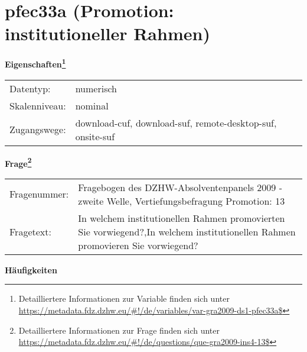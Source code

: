 
    \setcounter{footnote}{0}

    \vspace*{-1.8cm}
	\section{pfec33a (Promotion: institutioneller Rahmen)}
	\label{section:pfec33a}



    \vspace*{0.5cm}
    \noindent\textbf{Eigenschaften\footnote{Detailliertere Informationen zur Variable finden sich unter
		\url{https://metadata.fdz.dzhw.eu/\#!/de/variables/var-gra2009-ds1-pfec33a$}}}\\
	\begin{tabularx}{\hsize}{@{}lX}
	Datentyp: & numerisch \\
	Skalenniveau: & nominal \\
	Zugangswege: &
	  download-cuf, 
	  download-suf, 
	  remote-desktop-suf, 
	  onsite-suf
 \\
    \end{tabularx}



				\vspace*{0.5cm}
                \noindent\textbf{Frage\footnote{Detailliertere Informationen zur Frage finden sich unter
		              \url{https://metadata.fdz.dzhw.eu/\#!/de/questions/que-gra2009-ins4-13$}}}\\
				\begin{tabularx}{\hsize}{@{}lX}
					Fragenummer: &
					  Fragebogen des DZHW-Absolventenpanels 2009 - zweite Welle, Vertiefungsbefragung Promotion:
					  13
 \\
					Fragetext: & In welchem institutionellen Rahmen promovierten Sie vorwiegend?,In welchem institutionellen Rahmen promovieren Sie vorwiegend? \\
				\end{tabularx}





        		\vspace*{0.5cm}
                \noindent\textbf{Häufigkeiten}

